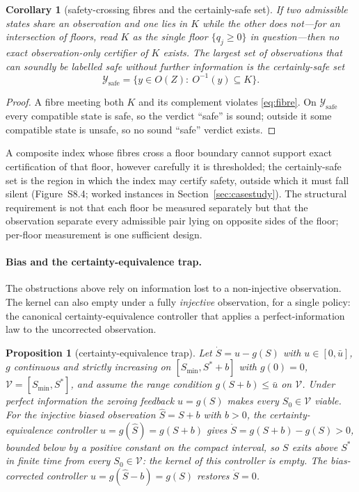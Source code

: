 \documentclass[11pt,a4paper]{article}
\theoremstyle{plain}
\newtheorem{proposition}[theorem]{Proposition}
\newtheorem{corollary}[theorem]{Corollary}
\theoremstyle{definition}
\theoremstyle{remark}
\newcommand{\cV}{\mathcal{V}}
\newcommand{\cY}{\mathcal{Y}}
\begin{document}
\begin{corollary}[safety-crossing fibres and the certainly-safe set]\label{cor:certainly-safe}
If two admissible states share an observation and one lies in $K$ while the other does not---for an intersection of floors, read $K$ as the single floor $\{q_j\ge0\}$ in question---then no exact observation-only certifier of $K$ exists. The largest set of observations that can soundly be labelled safe without further information is the \emph{certainly-safe set}
\[
\cY_{\mathrm{safe}}=\bigl\{y\in O(Z):\ O^{-1}(y)\subseteq K\bigr\}.
\]
\end{corollary}

\begin{proof}
A fibre meeting both $K$ and its complement violates \eqref{eq:fibre}. On $\cY_{\mathrm{safe}}$ every compatible state is safe, so the verdict ``safe'' is sound; outside it some compatible state is unsafe, so no sound ``safe'' verdict exists.
\end{proof}

A composite index whose fibres cross a floor boundary cannot support exact certification of that floor, however carefully it is thresholded; the certainly-safe set is the region in which the index may certify safety, outside which it must fall silent (Figure~S8.4; worked instances in Section~\ref{sec:casestudy}). The structural requirement is not that each floor be measured separately but that the observation separate every admissible pair lying on opposite sides of the floor; per-floor measurement is one sufficient design.

\paragraph{Bias and the certainty-equivalence trap.} The obstructions above rely on information lost to a non-injective observation. The kernel can also empty under a fully \emph{injective} observation, for a single policy: the canonical certainty-equivalence controller that applies a perfect-information law to the uncorrected observation.

\begin{proposition}[certainty-equivalence trap]\label{prop:ce-trap}
Let $\dot S=u-g(S)$ with $u\in[0,\bar u]$, $g$ continuous and strictly increasing on $[S_{\min},S^*+b]$ with $g(0)=0$, $\cV=[S_{\min},S^*]$, and assume the range condition $g(S+b)\le\bar u$ on $\cV$. Under perfect information the zeroing feedback $u=g(S)$ makes every $S_0\in\cV$ viable. For the injective biased observation $\hat S=S+b$ with $b>0$, the certainty-equivalence controller $u=g(\hat S)=g(S+b)$ gives $\dot S=g(S+b)-g(S)>0$, bounded below by a positive constant on the compact interval, so $S$ exits above $S^*$ in finite time from every $S_0\in\cV$: the kernel of this controller is empty. The bias-corrected controller $u=g(\hat S-b)=g(S)$ restores $\dot S=0$.
\end{proposition}
\end{document}
